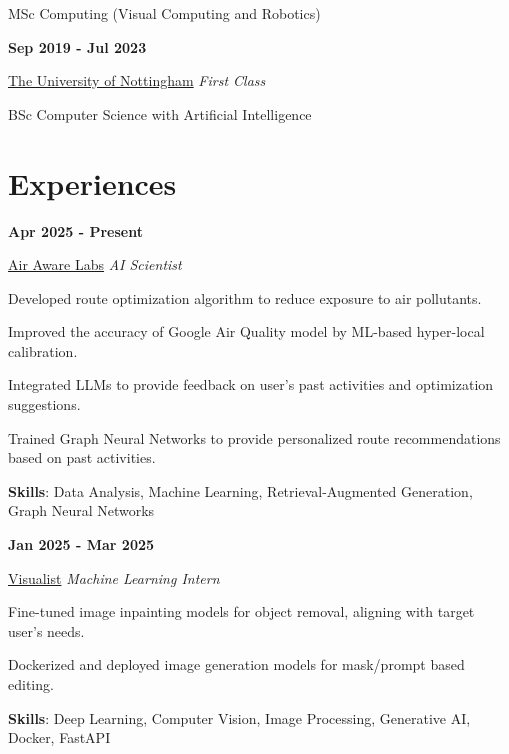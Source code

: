 \documentclass[9pt,a4paper]{article} %
\newenvironment{itemize-noindent}
{
\setlength{\leftmargini}{1em}
\begin{itemize}
\setlength{\itemsep}{0pt}
\setlength{\parskip}{0pt}
}
{\end{itemize}}
\begin{document}
\begin{multicols}{2}
MSc Computing (Visual Computing and Robotics)
\vspace{2mm}


\textbf{Sep 2019 - Jul 2023}

\href{https://www.nottingham.ac.uk}{The University of Nottingham} \hfill \textit{First Class}

BSc Computer Science with Artificial Intelligence


\section{Experiences}

\textbf{Apr 2025 - Present}

\href{https://www.airawarelabs.com}{Air Aware Labs} \hfill \textit{AI Scientist}

\begin{itemize-noindent}
    \item Developed route optimization algorithm to reduce exposure to air pollutants.
    \item Improved the accuracy of Google Air Quality model by ML-based hyper-local calibration.
    \item Integrated LLMs to provide feedback on user's past activities and optimization suggestions.
    \item Trained Graph Neural Networks to provide personalized route recommendations based on past activities.
    \item \textbf{Skills}: Data Analysis, Machine Learning, Retrieval-Augmented Generation, Graph Neural Networks
\end{itemize-noindent}
\vspace{2mm}


\textbf{Jan 2025 - Mar 2025}

\href{https://visualistapp.com/}{Visualist} \hfill \textit{Machine Learning Intern}

\begin{itemize-noindent}
    \item Fine-tuned image inpainting models for object removal, aligning with target user's needs.
    \item Dockerized and deployed image generation models for mask/prompt based editing.
    \item \textbf{Skills}: Deep Learning, Computer Vision, Image Processing, Generative AI, Docker, FastAPI
\end{itemize-noindent}
\vspace{2mm}


\end{multicols}
\end{document}

